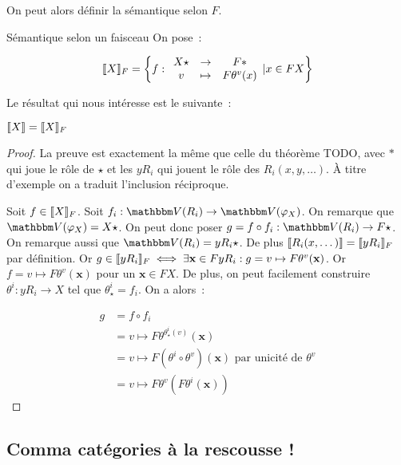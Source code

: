 On peut alors définir la sémantique selon $F$.

\begin{defi}{Sémantique selon un faisceau}
    On pose~:

    \[\llbracket {X} \rrbracket_F = \left\{f:\begin{array}{ccc}
        X\star & \rightarrow & F\ast \\
        v      & \mapsto     & F\theta^v(x)
    \end{array} | x\in F X\right\}\]
\end{defi}

Le résultat qui nous intéresse est le suivante~:

\begin{prop}
    $\llbracket {X} \rrbracket = \llbracket {X} \rrbracket_F$
\end{prop}

\begin{proof}
    La preuve est exactement la même que celle du théorème TODO, avec $\ast$ qui joue
    le rôle de $\star$ et les $yR_i$ qui jouent le rôle des $R_i(x, y, \dots)$. À
    titre d'exemple on a traduit l'inclusion réciproque.

    \boxed{\supseteq} Soit $f\in\llbracket {X} \rrbracket_F$. Soit $f_i : \V(R_i)\rightarrow\V(\phi_X)$.
    On remarque que $\V(\phi_X) = X\star$. On peut donc poser
    $g = f\circ f_i : \V(R_i)\rightarrow F\star$. On remarque aussi que
    $\V(R_i) = yR_i\star$. De plus $\llbracket {R_i(x, \dots)} \rrbracket = \llbracket {yR_i} \rrbracket_F$ par définition.
    Or $g\in\llbracket {yR_i} \rrbracket_F\iff
    \exists \mathbf{x}\in F y R_i: g = v\mapsto F\theta^v(\mathbf{x})$. Or
    $f = v\mapsto F\theta^v(\mathbf{x})$ pour un $\mathbf{x}\in F X$. De plus,
    on peut facilement construire $\theta^i : yR_i\rightarrow X$ tel que
    $\theta^i_\star = f_i$. On a alors~:

    \begin{align*}
        g &= f\circ f_i \\
          &= v\mapsto F\theta^{\theta^i_\star(v)}(\mathbf{x}) \\
          &= v\mapsto F(\theta^i\circ\theta^v)(\mathbf{x})\text{ par unicité de $\theta^v$} \\
          &= v\mapsto F\theta^v(F\theta^i(\mathbf{x}))
    \end{align*}
\end{proof}

\subsection{Comma catégories à la rescousse !}

